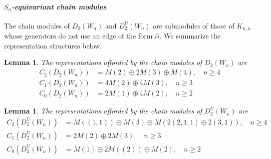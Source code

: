 \documentclass[12pt]{amsart}
\newtheorem{lem}[thm]{Lemma}
\theoremstyle{definition}
\newcommand{\conf}{\operatorname{Conf}}
\begin{document}
\paragraph{\textit{$S_n$-equivariant chain modules}} 
The chain modules of $D_2(W_n)$ and $D^U_2(W_n)$ are submodules of those of $K_{n,n}$ whose generators do not use an edge of the form ${i\bar i}$. We summarize the representation structures below.

\begin{lem}
    The representations afforded by the chain modules of $D_2(W_n)$ are
    \begin{align*}
        C_2(D_2(W_n)) &= M(2)\oplus 2M(3) \oplus M(4),\quad n\geq 4\\
        C_1(D_2(W_n)) &= 4M(2)\oplus 4M(3),\quad n\geq 3\\
        C_0(D_2(W_n)) &= 2M(1)\oplus 4M(2),\quad n\geq 2
    \end{align*}
\end{lem}
\begin{lem}
The representations afforded by the chain modules of $D^U_2(W_n)$ are
\begin{align*}
C_2(D^U_2(W_n)) &= M((1,1))\oplus M(3) \oplus M(2(2,1,1)\oplus 2(3,1)),\quad n\geq 4\\
C_1(D^U_2(W_n)) &= 2M(2)\oplus 2M(3),\quad n\geq 3\\
C_0(D^U_2(W_n)) &= M(1)\oplus 2M((2))\oplus M(2),\quad n\geq 2
\end{align*}
\end{lem}
\end{document}
